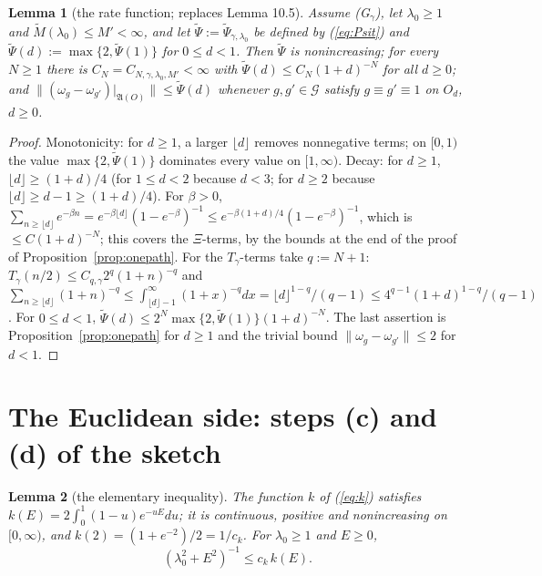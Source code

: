 \documentclass[11pt,a4paper]{article}
\newcommand{\A}{\mathfrak{A}}
\newcommand{\G}{\mathcal{G}}
\newcommand{\Mt}{\widetilde M}                %
\newcommand{\Psit}{\widetilde\Psi}
\theoremstyle{plain}
\newtheorem{tlemma}{Lemma}
\theoremstyle{definition}
\begin{document}
\begin{tlemma}[the rate function; replaces Lemma 10.5]\label{lem:rate}
Assume (G$_\gamma$), let $\lambda_0\ge1$ and $\Mt(\lambda_0)\le M'<\infty$, and let
$\Psit:=\Psit_{\gamma,\lambda_0}$ be defined by (\ref{eq:Psit}) and
$\Psit(d):=\max\{2,\Psit(1)\}$ for $0\le d<1$.  Then $\Psit$ is nonincreasing; for every
$N\ge1$ there is $C_N=C_{N,\gamma,\lambda_0,M'}<\infty$ with $\Psit(d)\le C_N(1+d)^{-N}$ for all
$d\ge0$; and $\|(\omega_g-\omega_{g'})|_{\A(O)}\|\le\Psit(d)$ whenever $g,g'\in\G$ satisfy
$g\equiv g'\equiv1$ on $O_d$, $d\ge0$.
\end{tlemma}

\begin{proof}
Monotonicity: for $d\ge1$, a larger $\lfloor d\rfloor$ removes nonnegative terms; on $[0,1)$
the value $\max\{2,\Psit(1)\}$ dominates every value on $[1,\infty)$.  Decay: for $d\ge1$,
$\lfloor d\rfloor\ge(1+d)/4$ (for $1\le d<2$ because $d<3$; for $d\ge2$ because
$\lfloor d\rfloor\ge d-1\ge(1+d)/4$).  For $\beta>0$,
$\sum_{n\ge\lfloor d\rfloor}e^{-\beta n}=e^{-\beta\lfloor d\rfloor}(1-e^{-\beta})^{-1}\le
e^{-\beta(1+d)/4}(1-e^{-\beta})^{-1}$, which is $\le C(1+d)^{-N}$; this covers the
$\Xi$-terms, by the bounds at the end of the proof of Proposition~\ref{prop:onepath}.  For the
$T_\gamma$-terms take $q:=N+1$: $T_\gamma(n/2)\le C_{q,\gamma}2^q(1+n)^{-q}$ and
$\sum_{n\ge\lfloor d\rfloor}(1+n)^{-q}\le\int_{\lfloor d\rfloor-1}^\infty(1+x)^{-q}dx=
\lfloor d\rfloor^{1-q}/(q-1)\le4^{q-1}(1+d)^{1-q}/(q-1)$.  For $0\le d<1$,
$\Psit(d)\le2^N\max\{2,\Psit(1)\}(1+d)^{-N}$.  The last assertion is
Proposition~\ref{prop:onepath} for $d\ge1$ and the trivial bound
$\|\omega_g-\omega_{g'}\|\le2$ for $d<1$.
\end{proof}

\section{The Euclidean side: steps (c) and (d) of the sketch}\label{sec:euclidean}

\begin{tlemma}[the elementary inequality]\label{lem:ineq}
The function $k$ of (\ref{eq:k}) satisfies $k(E)=2\int_0^1(1-u)e^{-uE}du$; it is continuous,
positive and nonincreasing on $[0,\infty)$, and $k(2)=(1+e^{-2})/2=1/c_k$.  For $\lambda_0\ge1$
and $E\ge0$,
\[
 (\lambda_0^2+E^2)^{-1}\le c_k\,k(E) .
\]
\end{tlemma}
\end{document}
